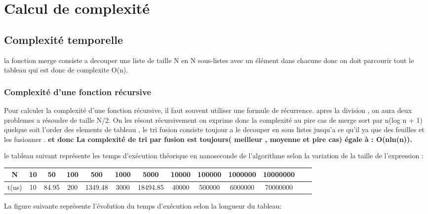 \section{Calcul de complexité}

\subsection{Complexité temporelle}
la fonction merge consiste a decouper une liste de taille N en N sous-listes avec un élément dans chacune donc on doit parcourir tout le tableau qui est donc de complexite O(n). 
\subsubsection{Complexité d'une fonction récursive}
Pour calculer la complexité d'une fonction récursive, il faut souvent utiliser une formule de récurrence. 
apres la division , on aura deux problemes a résoudre de taille N/2.
On les résout récursivement 
on exprime donc la complexité au pire cas de merge sort par n(log n + 1) 
quelque soit l'order des elements de tableau , le tri fusion consiste toujour a le decouper en sous listes jusqu'a ce qu'il ya que des feuilles et les fusionner .
\textbf{et donc La complexité de tri par fusion est toujours( meilleur , moyenne et pire cas) égale à : O(nln(n)).}
\\
\par
le tableau suivant représente les temps d’exécution théorique en nanoseconde de l’algorithme selon la variation de la taille de l’expression :
\small
\begin{center}
\begin{tabular}{| c | c | c | c | c | c | c | c | c | c | c | c | c |}
    \hline
    N &  10 & 50 & 100 & 500 & 1000 & 5000 & 10000 & 100000 & 1000000 & 10000000 \\
    \hline
    t(ns) & 10 &
84.95&
200&
1349.48&
3000&
18494.85&
40000&
500000&
6000000&
70000000 \\
    \hline
\end{tabular}  
\end{center}
\par
La figure suivante représente l’évolution du temps d’exécution selon la longueur du tableau: 
